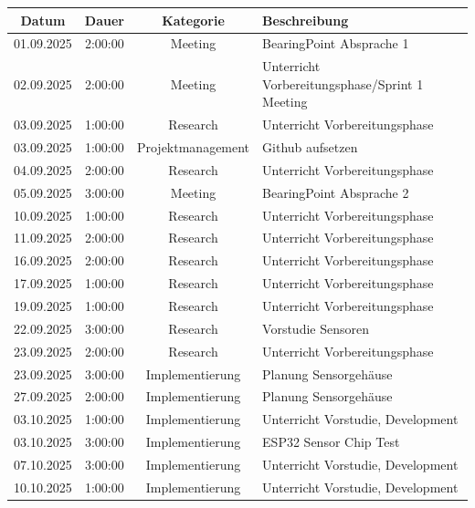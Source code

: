 \documentclass{article}
\begin{document}
\begin{table}[H]
  \centering
  \begin{tabularx}{\textwidth}{|c|c|c|X|}
    \hline
    \rowcolor{black!10}\textbf{Datum} & \textbf{Dauer} & \textbf{Kategorie} & \textbf{Beschreibung} \\
    \hline
    01.09.2025 & 2:00:00 & Meeting           & BearingPoint Absprache 1 \\ \hline
    02.09.2025 & 2:00:00 & Meeting           & Unterricht Vorbereitungsphase/Sprint 1 Meeting \\ \hline
    03.09.2025 & 1:00:00 & Research          & Unterricht Vorbereitungsphase \\ \hline
    03.09.2025 & 1:00:00 & Projektmanagement & Github aufsetzen \\ \hline
    04.09.2025 & 2:00:00 & Research          & Unterricht Vorbereitungsphase \\ \hline
    05.09.2025 & 3:00:00 & Meeting           & BearingPoint Absprache 2 \\ \hline
    10.09.2025 & 1:00:00 & Research          & Unterricht Vorbereitungsphase \\ \hline
    11.09.2025 & 2:00:00 & Research          & Unterricht Vorbereitungsphase \\ \hline
    16.09.2025 & 2:00:00 & Research          & Unterricht Vorbereitungsphase \\ \hline
    17.09.2025 & 1:00:00 & Research          & Unterricht Vorbereitungsphase \\ \hline
    19.09.2025 & 1:00:00 & Research          & Unterricht Vorbereitungsphase \\ \hline
    22.09.2025 & 3:00:00 & Research          & Vorstudie Sensoren \\ \hline
    23.09.2025 & 2:00:00 & Research          & Unterricht Vorbereitungsphase \\ \hline
    23.09.2025 & 3:00:00 & Implementierung   & Planung Sensorgehäuse \\ \hline
    27.09.2025 & 2:00:00 & Implementierung   & Planung Sensorgehäuse \\ \hline
    03.10.2025 & 1:00:00 & Implementierung   & Unterricht Vorstudie, Development \\ \hline
    03.10.2025 & 3:00:00 & Implementierung   & ESP32 Sensor Chip Test \\ \hline
    07.10.2025 & 3:00:00 & Implementierung   & Unterricht Vorstudie, Development \\ \hline
    10.10.2025 & 1:00:00 & Implementierung   & Unterricht Vorstudie, Development \\ \hline

\end{tabularx}
\end{table}
\end{document}
